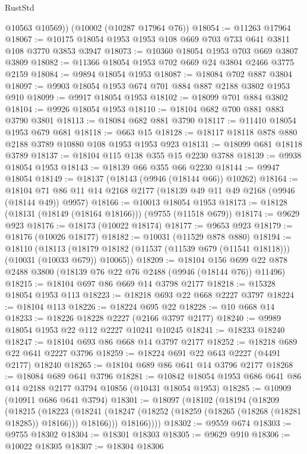 \begin{lexlean}{RustStd}
\begin{coremodule}
        @10563
        @10569))
    (@10002 (@10287 @17964 @76))
@18054 := @11263 @17964
@18067 := @10175 @18054 @1953 @1953 @108 @669 @703 @733 @641 @3811 @108 @3770 @3853 @3947
@18073 := @10360 @18054 @1953 @703 @669 @3807 @3809
@18082 := @11366 @18054 @1953 @702 @669 @24 @3804 @2466 @3775 @2159
@18084 := @9894 @18054 @1953
@18087 := @18084 @702 @887 @3804
@18097 := @9903 @18054 @1953 @674 @701 @884 @887 @2188 @3802 @1953 @910
@18099 := @9917 @18054 @1953
@18102 := @18099 @701 @884 @3802
@18104 := @9926 @18054 @1953
@18110 := @18104 @682 @700 @881 @883 @3790 @3801
@18113 := @18084 @682 @881 @3790
@18117 := @11410 @18054 @1953 @679 @681
@18118 := @663 @15
@18128 := @18117 @18118 @878 @880 @2188 @3789 @10880 @108 @1953 @1953 @923
@18131 := @18099 @681 @18118 @3789
@18137 := @18104 @115 @138 @355 @15 @2230 @3788
@18139 := @9938 @18054 @1953
@18143 := @18139 @66 @355 @66 @2230
@18144 := @9947 @18054
@18149 := @18137 (@18143 (@9946 (@18144 @66)) @10262)
@18164 := @18104 @71 @86 @11 @14 @2168 @2177 (@18139 @49 @11 @49 @2168 (@9946 (@18144 @49)) @9957)
@18166 := @10013 @18054 @1953
@18173 := @18128 (@18131 (@18149 (@18164 @18166))) (@9755 (@11518 @679))
@18174 := @9629 @923
@18176 := @18173 (@10022 @18174)
@18177 := @9653 @923
@18179 := @18176 (@10026 @18177)
@18182 := @10031 (@11529 @878 @880)
@18194 := @18110
    (@18113 (@18179 @18182 (@11537 (@11539 @679 (@11541 @18118))) (@10031 (@10033 @679)) @10065))
@18209 := @18104
    @156
    @699
    @22
    @878
    @2488
    @3800
    (@18139 @76 @22 @76 @2488 (@9946 (@18144 @76)) @11496)
@18215 := @18104 @697 @86 @669 @14 @3798 @2177
@18218 := @15328 @18054 @1953 @113
@18223 := @18218 @693 @22 @668 @2227 @3797
@18224 := @18104 @113
@18226 := @18224 @695 @22
@18228 := @10 @668 @14
@18233 := @18226 @18228 @2227 (@2166 @3797 @2177)
@18240 := @9989 @18054 @1953 @22 @112 @2227 @10241 @10245
@18241 := @18233 @18240
@18247 := @18104 @693 @86 @668 @14 @3797 @2177
@18252 := @18218 @689 @22 @641 @2227 @3796
@18259 := @18224 @691 @22 @643 @2227 (@4491 @2177) @18240
@18265 := @18104 @689 @86 @641 @14 @3796 @2177
@18268 := @18084 @689 @641 @3796
@18281 := @10842 @18054 @1953 @686 @641 @86 @14 @2188 @2177 @3794 @10856 (@10431 @18054 @1953)
@18285 := @10909 (@10911 @686 @641 @3794)
@18301 := @18097
    (@18102
      (@18194
        (@18209
          (@18215
            (@18223
              (@18241 (@18247 (@18252 (@18259 (@18265 (@18268 (@18281 @18285)) @18166))) @18166)))
            @18166))))
@18302 := @9559 @674
@18303 := @9755 @18302
@18304 := @18301 @18303
@18305 := @9629 @910
@18306 := @10022 @18305
@18307 := @18304 @18306

\end{coremodule}
\end{lexlean}
